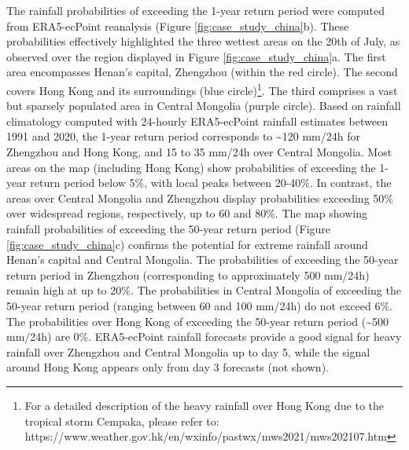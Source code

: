 The  rainfall probabilities of exceeding the 1-year return period were computed from ERA5-ecPoint reanalysis (Figure \ref{fig:case_study_china}b). These probabilities effectively highlighted the three wettest areas on the 20th of July, as observed over the region displayed in Figure \ref{fig:case_study_china}a. The first area encompasses Henan's capital, Zhengzhou (within the red circle). The second covers Hong Kong and its surroundings (blue circle)\footnote{For a detailed description of the heavy rainfall over Hong Kong due to the tropical storm Cempaka, please refer to: https://www.weather.gov.hk/en/wxinfo/pastwx/mws2021/mws202107.htm}. The third comprises a vast but sparsely populated area in Central Mongolia (purple circle). Based on rainfall climatology computed with 24-hourly ERA5-ecPoint rainfall estimates between 1991 and 2020, the 1-year return period corresponds to \sim120 mm/24h for Zhengzhou and Hong Kong, and 15 to 35 mm/24h over Central Mongolia. Most areas on the map (including Hong Kong) show probabilities of exceeding the 1-year return period below 5\%, with local peaks between 20-40\%. In contrast, the areas over Central Mongolia and Zhengzhou display probabilities exceeding 50\% over widespread regions, respectively, up to 60 and 80\%. The map showing rainfall probabilities of exceeding the 50-year return period (Figure \ref{fig:case_study_china}c) confirms the potential for extreme rainfall around Henan's capital and Central Mongolia. The probabilities of exceeding the 50-year return period in Zhengzhou (corresponding to approximately 500 mm/24h) remain high at up to 20\%. The probabilities in Central Mongolia of exceeding the 50-year return period (ranging between 60 and 100 mm/24h) do not exceed 6\%. The probabilities over Hong Kong of exceeding the 50-year return period (\sim 500 mm/24h) are 0\%. ERA5-ecPoint rainfall forecasts provide a good signal for heavy rainfall over Zhengzhou and Central Mongolia up to day 5, while the signal around Hong Kong appears only from day 3 forecasts (not shown).

